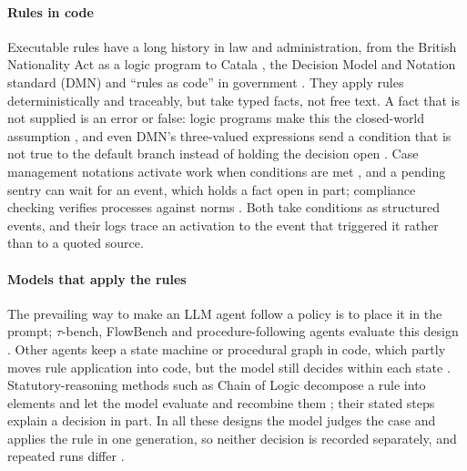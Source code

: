 \paragraph{Rules in code}
Executable rules have a long history in law and administration, from the British Nationality Act as a logic program \cite{sergot1986british} to Catala \cite{merigoux2021catala}, the Decision Model and Notation standard (DMN) \cite{omg2024dmn} and ``rules as code'' in government \cite{mohun2020cracking}. They apply rules deterministically and traceably, but take typed facts, not free text. A fact that is not supplied is an error or false: logic programs make this the closed-world assumption \cite{reiter1978closed}, and even DMN's three-valued expressions send a condition that is not true to the default branch instead of holding the decision open \cite{omg2024dmn}. Case management notations activate work when conditions are met \cite{omg2016cmmn,hull2011business}, and a pending sentry can wait for an event, which holds a fact open in part; compliance checking verifies processes against norms \cite{governatori2006compliance,hashmi2018compliance}. Both take conditions as structured events, and their logs trace an activation to the event that triggered it rather than to a quoted source.

\paragraph{Models that apply the rules}
The prevailing way to make an LLM agent follow a policy is to place it in the prompt; $\tau$-bench, FlowBench and procedure-following agents evaluate this design \cite{yao2025taubench,xiao2024flowbench,ye2025sopagent,li2026sopbench}. Other agents keep a state machine or procedural graph in code, which partly moves rule application into code, but the model still decides within each state \cite{wu2024stateflow,lu2026proceduralgraphs,yu2026compile}. Statutory-reasoning methods such as Chain of Logic decompose a rule into elements and let the model evaluate and recombine them \cite{servantez2024chain,blairstanek2023statutory,holzenberger2020dataset,guha2023legalbench}; their stated steps explain a decision in part. In all these designs the model judges the case and applies the rule in one generation, so neither decision is recorded separately, and repeated runs differ \cite{atil2025nondeterminism,blairstanek2025unstable}.

